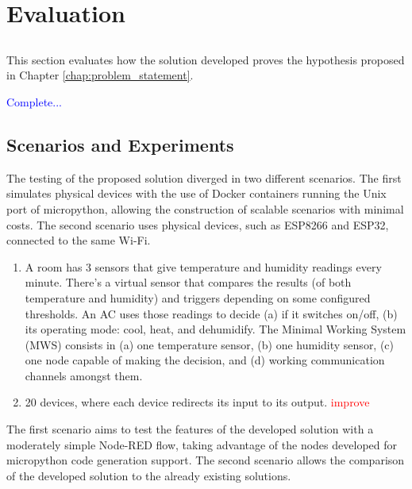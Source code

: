 \chapter{Evaluation} \label{chap:evaluation} \minitoc

\section*{}

This section evaluates how the solution developed proves the hypothesis proposed in Chapter \ref{chap:problem_statement}.

\textcolor{blue}{Complete...}


\section{Scenarios and Experiments}\label{sec:scenarios_experiments}

The testing of the proposed solution diverged in two different scenarios. The first simulates physical devices with the use of Docker containers running the Unix port of micropython, allowing the construction of scalable scenarios with minimal costs. The second scenario uses physical devices, such as ESP8266 and ESP32, connected to the same Wi-Fi.

\begin{enumerate}
    \item A room has 3 sensors that give temperature and humidity readings every minute. There’s a virtual sensor that compares the results (of both temperature and humidity) and triggers depending on some configured thresholds. An AC uses those readings to decide (a) if it switches on/off, (b) its operating mode: cool, heat, and dehumidify. The Minimal Working System (MWS) consists in (a) one temperature sensor, (b) one humidity sensor, (c) one node capable of making the decision, and (d) working communication channels amongst them.
    \item 20 devices, where each device redirects its input to its output. \textcolor{red}{improve}
\end{enumerate}

The first scenario aims to test the features of the developed solution with a moderately simple Node-RED flow, taking advantage of the nodes developed for micropython code generation support. The second scenario allows the comparison of the developed solution to the already existing solutions.

